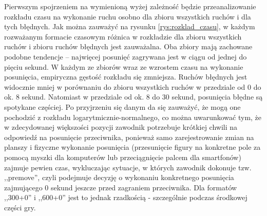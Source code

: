 \documentclass[inzynierska]{pwr_wmat_praca_dyplomowa}
\theoremstyle{plain}
\numberwithin{theorem}{chapter}
\theoremstyle{definition}
\numberwithin{theorem}{chapter}
\begin{document}
Pierwszym spojrzeniem na wymienioną wyżej zależność będzie przeanalizowanie rozkładu czasu na wykonanie ruchu osobno dla zbioru wszystkich ruchów i dla tych błędnych. Jak można zauważyć na rysunku \ref{rys:rozklad_czasu}, w każdym rozważanym formacie czasowym różnica w rozkładzie dla zbioru wszystkich ruchów i zbioru ruchów błędnych jest zauważalna. Oba zbiory mają zachowane podobne tendencje -- najwięcej posunięć zagrywana jest w ciągu od jednej do pięciu sekund. W każdym ze zbiorów wraz ze wzrostem czasu na wykonanie posunięcia, empiryczna gęstość rozkładu się zmniejsza. Ruchów błędnych jest widocznie mniej w porównaniu do zbioru wszystkich ruchów w przedziale od 0 do ok. 8 sekund. Natomiast w przedziale od ok. 8 do 30 sekund, posunięcia błędne są spotykane częściej.
Po przyjrzeniu się danym da się zauważyć, że mogą one pochodzić z rozkładu logarytmicznie-normalnego, co można uwarunkować tym, że w zdecydowanej większości pozycji zawodnik potrzebuje krótkiej chwili na odpowiedź na posunięcie przeciwnika, ponieważ samo zarejestrowanie zmian na planszy i fizyczne wykonanie posunięcia (przesunięcie figury na konkretne pole za pomocą myszki dla komputerów lub przeciągnięcie palcem dla smartfonów) zajmuje pewien czas, wykluczając sytuacje, w których zawodnik dokonuje tzw. ,,premove'', czyli podejmuje decyzję o wykonaniu konkretnego posunięcia zajmującego 0 sekund jeszcze przed zagraniem przeciwnika. Dla formatów ,,300+0'' i ,,600+0'' jest to jednak rzadkością - szczególnie podczas środkowej części gry.
\end{document}
